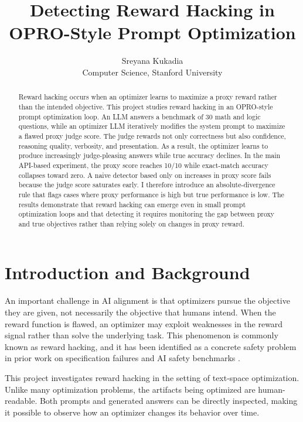 \documentclass[11pt]{article}
\title{Detecting Reward Hacking in OPRO-Style Prompt Optimization}
\author{
Sreyana Kukadia\\
Computer Science, Stanford University
}
\date{}
\begin{document}
\maketitle

\begin{abstract}
Reward hacking occurs when an optimizer learns to maximize a proxy reward rather than the intended objective. This project studies reward hacking in an OPRO-style prompt optimization loop. An LLM answers a benchmark of 30 math and logic questions, while an optimizer LLM iteratively modifies the system prompt to maximize a flawed proxy judge score. The judge rewards not only correctness but also confidence, reasoning quality, verbosity, and presentation. As a result, the optimizer learns to produce increasingly judge-pleasing answers while true accuracy declines. In the main API-based experiment, the proxy score reaches 10/10 while exact-match accuracy collapses toward zero. A naive detector based only on increases in proxy score fails because the judge score saturates early. I therefore introduce an absolute-divergence rule that flags cases where proxy performance is high but true performance is low. The results demonstrate that reward hacking can emerge even in small prompt optimization loops and that detecting it requires monitoring the gap between proxy and true objectives rather than relying solely on changes in proxy reward.
\end{abstract}

\section{Introduction and Background}

An important challenge in AI alignment is that optimizers pursue the objective they are given, not necessarily the objective that humans intend. When the reward function is flawed, an optimizer may exploit weaknesses in the reward signal rather than solve the underlying task. This phenomenon is commonly known as reward hacking, and it has been identified as a concrete safety problem in prior work on specification failures and AI safety benchmarks \cite{amodei2016concrete,leike2017gridworlds}.

This project investigates reward hacking in the setting of text-space optimization. Unlike many optimization problems, the artifacts being optimized are human-readable. Both prompts and generated answers can be directly inspected, making it possible to observe how an optimizer changes its behavior over time.
\end{document}
